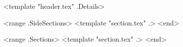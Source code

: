 \documentclass[letterpaper]{article}
\begin{document}
<template "header.tex" .Details>
\begin{minipage}[t]{0.33\textwidth}
<range .SideSections>
<template "section.tex" .>
<end>
\end{minipage}
\hspace{.02\textwidth}
\begin{minipage}[t]{0.65\textwidth}
<range .Sections>
<template "section.tex" .>
<end>
\end{minipage}
\end{document}
